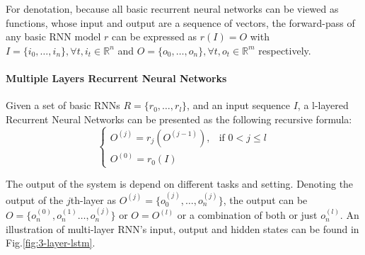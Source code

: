 For denotation, because all basic recurrent neural networks can be viewed as functions, whose input and output are a sequence of vectors, the forward-pass of any basic RNN model \(r\) can be expressed as \(r(I) = O\) with \(I = \{i_0,\ldots,i_n\}, \forall t, i_t \in \mathbb{R}^n\) and \(O = \{o_0,\ldots,o_n\}, \forall t, o_t \in \mathbb{R}^m\) respectively. 

\paragraph{Multiple Layers Recurrent Neural Networks}
Given a set of basic RNNs \(R = \{r_0,\ldots,r_l\}\), and an input sequence \(I\), a l-layered Recurrent Neural Networks can be presented as the following recursive formula:
\begin{equation}
	\begin{cases}
	O^{(j)} = r_j(O^{(j-1)}), & \mbox{if }  0 < j \leq l\\
	O^{(0)} = r_0(I) 
	\end{cases}
\end{equation}

The output of the system is depend on different tasks and setting. 
Denoting the output of the \(j\)th-layer as  \(O^{(j)} = \{o^{(j)}_0,\ldots,o^{(j)}_n\}\), the output can be \(O= \{o^{(0)}_n, o^{(1)}_n\ldots,o^{(j)}_n\}\)\cite{treeLSTM} or \(O = O^{(l)}\) or a combination of both or just \(o^{(l)}_n\). 
An illustration of multi-layer RNN's input, output and hidden states can be found in Fig.\ref{fig:3-layer-lstm}.

